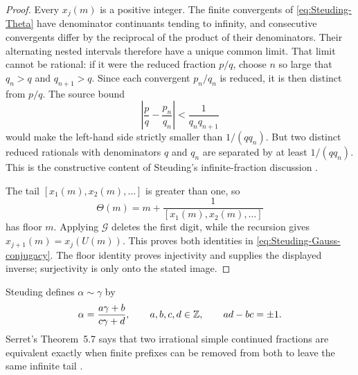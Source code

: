 \begin{proof}
Every $x_j(m)$ is a positive integer.  The finite convergents of
\eqref{eq:Steuding-Theta} have denominator continuants tending to infinity,
and consecutive convergents differ by the reciprocal of the product of
their denominators.  Their alternating nested intervals therefore have a
unique common limit.  That limit cannot be rational: if it were the reduced
fraction $p/q$, choose $n$ so large that $q_n>q$ and $q_{n+1}>q$.  Since each
convergent $p_n/q_n$ is reduced, it is then distinct from $p/q$.  The source
bound
\[
 \left|\frac{p}{q}-\frac{p_n}{q_n}\right|<
 \frac{1}{q_nq_{n+1}}
\]
would make the left-hand side strictly smaller than $1/(q q_n)$.  But two
distinct reduced rationals with
denominators $q$ and $q_n$ are separated by at least $1/(q q_n)$.  This is
the constructive
content of Steuding's infinite-fraction discussion
\cite[Sec.~3.4, printed pp.~42--43]{Steuding2005}.

The tail $[x_1(m),x_2(m),\ldots]$ is greater than one, so
\[
 \Theta(m)=m+\frac{1}{[x_1(m),x_2(m),\ldots]}
\]
has floor $m$.  Applying $\mathcal G$ deletes the first digit, while the
recursion gives $x_{j+1}(m)=x_j(U(m))$.  This proves both identities in
\eqref{eq:Steuding-Gauss-conjugacy}.  The floor identity proves injectivity
and supplies the displayed inverse; surjectivity is only onto the stated
image.
\end{proof}

Steuding defines $\alpha\sim\gamma$ by
\begin{equation}
\label{eq:Steuding-unimodular-equivalence}
 \alpha=\frac{a\gamma+b}{c\gamma+d},
 \qquad
 a,b,c,d\in\mathbb{Z},
 \qquad
 ad-bc=\pm1.
\end{equation}
Serret's Theorem~5.7 says that two irrational simple continued fractions are
equivalent exactly when finite prefixes can be removed from both to leave the
same infinite tail \cite[printed pp.~79--80]{Steuding2005}.

